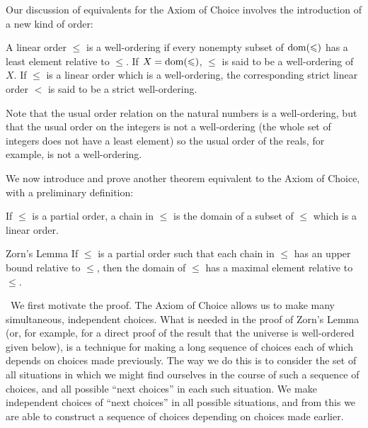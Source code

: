 Our discussion of equivalents for the Axiom of
Choice involves the introduction of a new kind
of order:

\begin{definition}
 A linear order $\leq$ is a {\upshape
 well-ordering} if every nonempty subset of
 $\mathop{\mathrm{dom}}(\leqslant)$ has a least element relative to $\leq$.
 If $X = \mathop{\mathrm{dom}}(\leqslant)$, $\leq$ is said to be a {\upshape well-ordering of
 $X$}.  If $\leq$ is a linear order which is a well-ordering, the
 corresponding strict linear order $<$ is said to be a
 {\upshape strict well-ordering}.
\end{definition}

Note that the usual order relation on the natural numbers
is a well-ordering, but that the usual order on the integers is not a
well-ordering (the whole set of integers does not have a least
element) so the usual order of the reals, for example, is
not a well-ordering.

We now introduce and prove another theorem equivalent to the
Axiom of Choice, with a preliminary definition:

\begin{definition}
 If $\leq$ is a partial order, a {\upshape
 chain\/} in $\leq$ is the domain of
 a subset of $\leq$ which is a linear order.
\end{definition}

\begin{Thm}{Zorn's Lemma}
 If $\leq$ is a partial order such that each chain in $\leq$ has
 an upper bound relative to $\leq$, then the domain of
 $\leq$ has a maximal element relative to $\leq$.
\end{Thm}

\preuve\ We first motivate the proof.  The Axiom of Choice allows us to make
many simultaneous, independent choices.  What is needed in the proof
of Zorn's Lemma (or, for example, for a direct proof of the result
that the universe is well-ordered given below), is a technique for
making a long sequence of choices each of which
depends on choices 
made previously.  The way we do this is to consider the set of all
situations in which we might find ourselves in the course of such a
sequence of choices, and all possible ``next choices'' in each such
situation.  We make independent choices of ``next choices'' in all
possible situations, and from this we are able to construct a sequence
of choices depending on choices made earlier.

